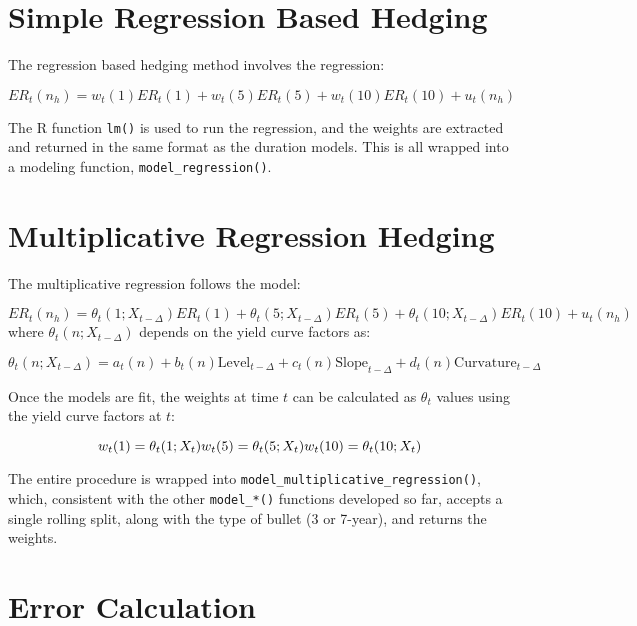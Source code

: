 \documentclass[openany]{book}
\theoremstyle{definition}
\theoremstyle{definition}
\theoremstyle{definition}
\theoremstyle{remark}
\begin{document}
\hypertarget{simple-regression-based-hedging}{%
\section{Simple Regression Based
Hedging}\label{simple-regression-based-hedging}}

The regression based hedging method involves the regression:

\[ ER_t(n_h) = w_t(1) ER_t(1) + w_t(5) ER_t(5) + w_t(10) ER_t(10) + u_t(n_h) \]

The R function \texttt{lm()} is used to run the regression, and the
weights are extracted and returned in the same format as the duration
models. This is all wrapped into a modeling function,
\texttt{model\_regression()}.

\small

\normalsize

\hypertarget{multiplicative-regression-hedging}{%
\section{Multiplicative Regression
Hedging}\label{multiplicative-regression-hedging}}

The multiplicative regression follows the model:

\[ ER_t(n_h) = \theta_t(1; X_{t-\Delta}) ER_t(1) + \theta_t(5; X_{t-\Delta}) ER_t(5) + \theta_t(10; X_{t-\Delta}) ER_t(10) + u_t(n_h) \]
where \(\theta_t(n; X_{t-\Delta})\) depends on the yield curve factors
as:

\[ \theta_t(n; X_{t-\Delta}) = a_t(n) + b_t(n) \text{Level}_{t-\Delta} + c_t(n) \text{Slope}_{t-\Delta} + d_t(n) \text{Curvature}_{t-\Delta} \]

Once the models are fit, the weights at time \(t\) can be calculated as
\(\theta_t\) values using the yield curve factors at \(t\):

\[ 
w_t(1) = \theta_t(1; X_t) \\ 
w_t(5) = \theta_t(5; X_t) \\ 
w_t(10) = \theta_t(10; X_t)
\]

The entire procedure is wrapped into
\texttt{model\_multiplicative\_regression()}, which, consistent with the
other \texttt{model\_*()} functions developed so far, accepts a single
rolling split, along with the type of bullet (3 or 7-year), and returns
the weights.

\small

\normalsize

\hypertarget{error-calculation}{%
\section{Error Calculation}\label{error-calculation}}
\end{document}
